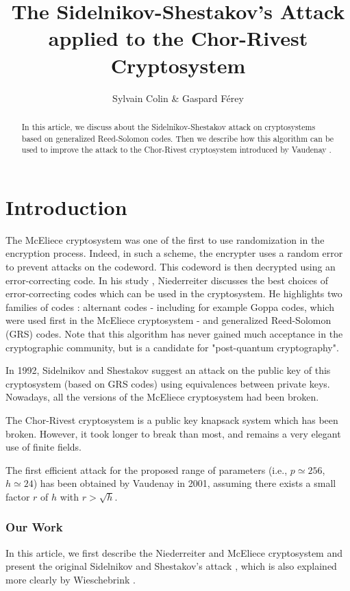 \documentclass[a4paper]{article}
\author{Sylvain Colin \& Gaspard Férey}
\title{The Sidelnikov-Shestakov's Attack applied to the Chor-Rivest Cryptosystem}
\begin{document}
\maketitle

\begin{abstract}
In this article, we discuss about the Sidelnikov-Shestakov attack \cite{SidelShes92} on cryptosystems based on generalized Reed-Solomon codes. Then we describe how this algorithm can be used to improve the attack to the Chor-Rivest cryptosystem introduced by Vaudenay \cite{Vau01}.
\end{abstract}

\section{Introduction}
\label{sec:intro}

The McEliece cryptosystem \cite{NiederH86} was one of the first to use randomization in the encryption process. Indeed, in such a scheme, the encrypter uses a random error to prevent attacks on the codeword. This codeword is then decrypted using an error-correcting code. 
In his study \cite{NiederH86}, Niederreiter discusses the best choices of error-correcting codes which can be used in the cryptosystem. He highlights two families of codes : alternant codes
 - including for example Goppa codes, which were used first in the McEliece cryptosystem - and generalized Reed-Solomon (GRS) codes.
Note that this algorithm has never gained much acceptance in the cryptographic community, but is a candidate for "post-quantum cryptography".

In 1992, Sidelnikov and Shestakov suggest an attack \cite{SidelShes92} on the public key of this cryptosystem (based on GRS codes) using equivalences between private keys.
Nowadays, all the versions of the McEliece cryptosystem had been broken.

The Chor-Rivest cryptosystem \cite{ChorRiv88} is a public key knapsack system which has been broken.  However, it took longer to break than most, and remains a very elegant use of finite fields.

The first efficient attack for the proposed range of parameters (i.e., $p \simeq 256$, $h \simeq 24$) has been obtained by Vaudenay in 2001, assuming there exists a small factor $r$ of $h$ with $r > \sqrt{h}$.


\subsubsection*{Our Work}
In this article, we first describe the Niederreiter and McEliece cryptosystem and present the original Sidelnikov and Shestakov's attack \cite{SidelShes92}, which is also explained more clearly by Wieschebrink \cite{Wiesch}.
\end{document}
